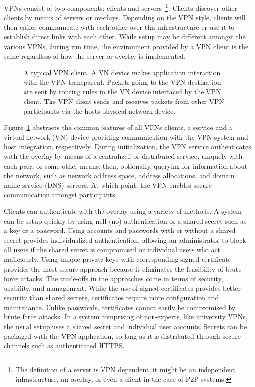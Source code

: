 VPNs consist of two components: clients and servers~\footnote{The definition of
a server is VPN dependent, it might be an independent infrastructure, an
overlay, or even a client in the case of P2P systems.}.  Clients discover other
clients by means of servers or overlays.  Depending on the VPN style, clients
will then either communicate with each other over this infrastructure or use it
to establish direct links with each other.  While setup may be different
amongst the various VPNs, during run time, the environment provided by a VPN
client is the same regardless of how the server or overlay is implemented.  

\begin{figure}
\centering
{}

\caption[A typical VPN client]{A typical VPN client.  A VN device makes
application interaction with the VPN transparent.  Packets going to the VPN
destination are sent by routing rules to the VN device interfaced by the VPN
client.  The VPN client sends and receives packets from other VPN participants
via the hosts physical network device.}

\label{fig:vpn}
\end{figure}

Figure~\ref{fig:vpn} abstracts the common features of all VPNs clients, a
service and a virtual network (VN) device providing communication with the VPN
system and host integration, respectively.  During initialization, the VPN
service authenticates with the overlay by means of a centralized or distributed
service, uniquely with each peer, or some other means; then, optionally,
querying for information about the network, such as network address space,
address allocations, and domain name service (DNS) servers.  At which point,
the VPN enables secure communication amongst participants.

Clients can authenticate with the overlay using a variety of methods.  A system
can be setup quickly by using null (no) authentication or a shared secret such
as a key or a password.  Using accounts and passwords with or without a shared
secret provides individualized authentication, allowing an administrator to
block all users if the shared secret is compromised or individual users who act
maliciously.  Using unique private keys with corresponding signed certificate
provides the most secure approach because it eliminates the feasibility of
brute force attacks.  The trade-offs in the approaches come in terms of
security, usability, and management.  While the use of signed certificates
provides better security than shared secrets, certificates require more
configuration and maintenance.  Unlike passwords, certificates cannot easily be
compromised by brute force attacks.  In a system comprising of non-experts,
like university VPNs, the usual setup uses a shared secret and individual user
accounts.  Secrets can be packaged with the VPN application, so long as it is
distributed through secure channels such as authenticated HTTPS.

